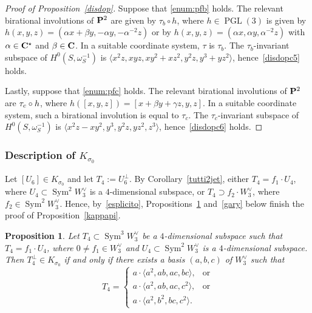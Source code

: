 \documentclass[11pt]{article}
\newtheorem{prop}[lemm]{Proposition}
\theoremstyle{definition}
\let\la\langle
\let\ra\rangle
\DeclareMathOperator{\PGL}{PGL}
\DeclareMathOperator{\Sym}{Sym}
\begin{document}
\begin{proof}[Proof of Proposition~\ref{disdop}]
Suppose that \eqref{enum:pfb} holds. The relevant birational involutions of $\PP^2$ are given by $\tau_b\circ h$, where
$h\in\PGL(3)$ is given by $h(x,y,z)=(\alpha x+\beta y,-\alpha y,-\alpha^{-2} z)$ or by $h(x,y,z)=(\alpha x,\alpha y,\alpha^{-2} z)$ with $\alpha\in\CC^\star$ and $\beta\in\CC$. In a suitable coordinate system, $\tau$ is $\tau_b$.
The $\tau_b$-invariant subspace of $H^0({ S},\omega^{-1}_{{ S}})$ is $\la x^2z, xyz, xy^2+xz^2,y^2z, y^3+yz^2 \ra$, hence~\eqref{disdopc5} holds.

Lastly, suppose that \eqref{enum:pfc} holds. The relevant birational involutions of $\PP^2$ are $\tau_c\circ\nobreak h$, where
$h([x,y,z])=[x+\beta y+\gamma z,y, z]$. In a suitable coordinate system, such a birational involution is equal to $\tau_c$. The $\tau_c$-invariant subspace of $H^0({ S},\omega^{-1}_{{ S}})$ is \hbox{$\la x^2z-xy^2, y^3, y^2z, yz^2, z^3 \ra$}, hence~\eqref{disdopc6} holds.
\end{proof}

\subsubsection{Description of $K_{\sigma_0}$}\label{dimokappa}

Let $[U_6]\in K_{\sigma_0}$ and let $T_4:=U_6^{\bot}$. By Corollary~\ref{tutti2jet}, either $T_4=f_1\cdot U_4$, where $U_4\subset\Sym^2\! W_3^{\vee}$ is a $4$-dimensional subspace, or $T_4\supset f_2\cdot W_3^{\vee}$, where
$f_2\in \Sym^2 \!W_3^{\vee}$. Hence, by~\eqref{esplicito}, Propositions~\ref{romain} and~\ref{gary} below finish the proof of Proposition~\ref{kappapi}.

\begin{prop}\label{romain}
Let $T_4\subset \Sym^3 \!W^{\vee}_3$ be a $4$-dimensional subspace such that
$T_4=f_1\cdot U_4$, where $0\ne f_1\in W_3^{\vee}$ and $U_4\subset\Sym^2\! W_3^{\vee}$ is a $4$-dimensional subspace.
Then $T_4^{\bot}\in K_{\sigma_0}$ if and only if there exists a basis $(a,b,c)$ of $W^{\vee}_3$ such that
\[
T_4=
\begin{cases}
a\cdot\la a^2, ab,ac,bc\ra,& \text{or}\\
a\cdot\la a^2,ab,ac,c^2\ra, &\text{or}\\
a\cdot\la a^2,b^2,bc,c^2\ra.
\end{cases}
\]
\end{prop}
\end{document}
